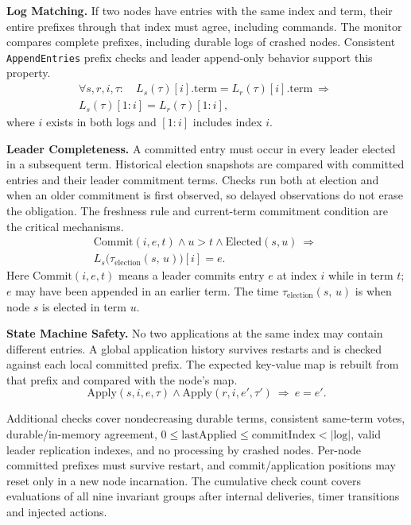 \documentclass[10pt,a4paper]{article}
\newcommand{\rpc}[1]{\mbox{\texttt{#1}}}
\begin{document}
\textbf{Log Matching.} If two nodes have entries with the same index and term,
their entire prefixes through that index must agree, including commands. The
monitor compares complete prefixes, including durable logs of crashed nodes.
Consistent \rpc{AppendEntries} prefix checks and leader append-only behavior support
this property.
\begin{equation}
\begin{aligned}
\forall s,r,i,\tau:\quad
L_s(\tau)[i].\mathrm{term} = L_r(\tau)[i].\mathrm{term}
\ \Longrightarrow\ \\
L_s(\tau)[1{:}i] = L_r(\tau)[1{:}i],
\end{aligned}
\end{equation}
where $i$ exists in both logs and $[1{:}i]$ includes index $i$.

\textbf{Leader Completeness.} A committed entry must occur in every leader
elected in a subsequent term. Historical election snapshots are compared with
committed entries and their leader commitment terms. Checks run both at election
and when an older commitment is first observed, so delayed observations do not
erase the obligation. The freshness rule and current-term commitment condition
are the critical mechanisms.
\begin{equation}
\begin{aligned}
\mathrm{Commit}(i, e, t) \land u > t \land \mathrm{Elected}(s, u)
\ \Longrightarrow\ \\
L_s\bigl(\tau_{\mathrm{election}}(s,\, u)\bigr)[i] = e.
\end{aligned}
\end{equation}
Here $\mathrm{Commit}(i, e, t)$ means a leader commits entry $e$ at index $i$
while in term $t$; $e$ may have been appended in an earlier term.
The time $\tau_{\mathrm{election}}(s,\, u)$ is when node $s$ is elected in term $u$.

\textbf{State Machine Safety.} No two applications at the same index may contain
different entries. A global application history survives restarts and is checked
against each local committed prefix. The expected key-value map is rebuilt from
that prefix and compared with the node's map.
\begin{equation}
\mathrm{Apply}(s, i, e, \tau) \land
\mathrm{Apply}(r, i, e', \tau') \ \Longrightarrow\ e = e'.
\end{equation}

Additional checks cover nondecreasing durable terms, consistent same-term votes,
durable/in-memory agreement,
$0 \leq \mathrm{lastApplied} \leq \mathrm{commitIndex} < \lvert\mathrm{log}\rvert$,
valid leader replication indexes, and no processing by crashed
nodes. Per-node committed prefixes must survive restart, and commit/application
positions may reset only in a new node incarnation. The cumulative check count
covers evaluations of all nine invariant groups after internal deliveries,
timer transitions and injected actions.
\end{document}
